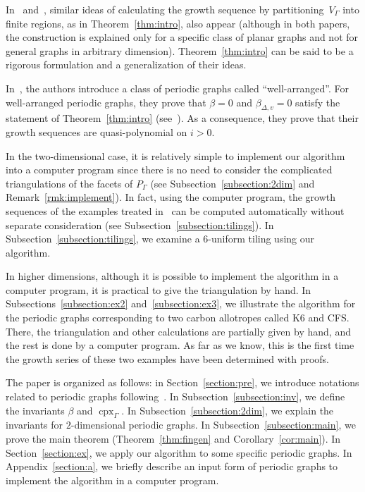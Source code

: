 In~\cite{SM20a} and~\cite{GS19}, 
similar ideas of calculating the growth sequence by partitioning~$V_{\Gamma}$ into finite regions, as in Theorem~\ref{thm:intro}, also appear (although in both papers, the construction is explained only for a specific class of planar graphs and not for general graphs in arbitrary dimension). 
Theorem~\ref{thm:intro} can be said to be a rigorous formulation and a generalization of their ideas. 

In~\cite{IN}, the authors introduce a class of periodic graphs called ``well-arranged''. 
For well-arranged periodic graphs, they prove that $\beta = 0$ and $\beta _{\Delta, v} = 0$ satisfy the statement of Theorem~\ref{thm:intro} (see~\cite[Claim 4.10]{IN}). As a consequence, they prove that their growth sequences are quasi-polynomial on $i  > 0$. 

In the two-dimensional case, 
it is relatively simple to implement our algorithm into a computer program 
since there is no need to consider the complicated triangulations of the facets of $P_{\Gamma}$ (see Subsection~\ref{subsection:2dim} and Remark~\ref{rmk:implement}). 
In fact, using the computer program, the growth sequences of the examples treated in~\cite{GS19} can be computed automatically without separate consideration (see Subsection~\ref{subsection:tilings}). 
In Subsection~\ref{subsection:tilings}, we examine a $6$-uniform tiling using our algorithm. 

In higher dimensions, although it is possible to implement the algorithm in a computer program, 
it is practical to give the triangulation by hand. 
In Subsections~\ref{subsection:ex2} and~\ref{subsection:ex3}, we illustrate the algorithm for the periodic graphs corresponding to two carbon allotropes called K6 and {\sf CFS}. 
There, the triangulation and other calculations are partially given by hand, and the rest is done by a computer program. 
As far as we know, this is the first time the growth series of these two examples have been determined with proofs.

The paper is organized as follows: 
in Section~\ref{section:pre}, we introduce notations related to periodic graphs following~\cite{IN}. 
In Subsection~\ref{subsection:inv}, we define the invariants $\beta$ and $\operatorname{cpx}_{\Gamma}$. 
In Subsection~\ref{subsection:2dim}, we explain the invariants for $2$-dimensional periodic graphs. 
In Subsection~\ref{subsection:main}, we prove the main theorem (Theorem~\ref{thm:fingen} and Corollary~\ref{cor:main}). 
In Section~\ref{section:ex}, we apply our algorithm to some specific periodic graphs. 
In Appendix~\ref{section:a}, we briefly describe an input form of periodic graphs to implement the algorithm in a computer program. 




